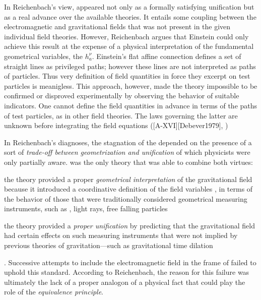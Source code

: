 \documentclass[draft]{article}
\newcommand{\hbein}{\ensuremath{h_{a}^{\nu}}\xspace}
\newcommand{\FP}{\german{Fernparallelismus}\xspace}
\begin{document}
In Reichenbach's view, \FP appeared not only as a formally satisfying unification but as a real advance over the available theories. It entails some coupling between the electromagnetic and gravitational fields that was not present in the given individual field theories. However, Reichenbach argues that Einstein could only achieve this result at the expense of a physical interpretation of the fundamental geometrical variables, the \hbein. Einstein's flat affine connection defines a set of straight lines as privileged paths; however these lines are not interpreted as paths of particles. Thus very definition of field quantities in force they excerpt on test particles is meanigless. This approach, however, made the theory impossible to be confirmed or disproved experimentally by observing the behavior of suitable indicators. One cannot define the field quantities in advance in terms of the paths of test particles, as in other field theories. The laws governing the latter are unknown before integrating the field equations ([A-XVI][Debever1979], \citep[23]{Einstein1930i})





In Reichenbach's diagnoses, the stagnation of the \uftp depended on the presence of a sort of \emph{trade-off between geometrization and unification} of which physicists were only partially aware. \Gr was the only theory that was able to combine both virtues: \begin{inparaenum}[(1)] \item the theory provided a proper \emph{geometrical interpretation} of the gravitational field because it introduced a coordinative definition of the field variables \gmn, in terms of the behavior of those that were traditionally considered geometrical measuring instruments, such as \rac, light rays, free falling particles \item the theory provided a \emph{proper unification} by predicting that the gravitational field had certain effects on such measuring instruments that were not implied by previous theories of gravitation---such as gravitational time dilation \end{inparaenum} \citep[350]{Reichenbach1928}. Successive attempts to include the electromagnetic field in the frame of \gr failed to uphold this standard. 
According to Reichenbach, the reason for this failure was ultimately the lack of a proper analogon of a physical fact that could play the role of the \emph{equivalence principle}. 
\end{document}
